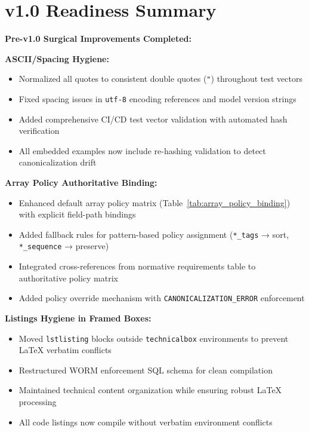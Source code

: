 \documentclass[12pt,a4paper]{article}
\begin{document}
\section*{v1.0 Readiness Summary}

\begin{technicalbox}
\textbf{Pre-v1.0 Surgical Improvements Completed:}

\textbf{ASCII/Spacing Hygiene:}
\begin{itemize}
\item Normalized all quotes to consistent double quotes (\texttt{"}) throughout test vectors
\item Fixed spacing issues in \texttt{utf-8} encoding references and model version strings
\item Added comprehensive CI/CD test vector validation with automated hash verification
\item All embedded examples now include re-hashing validation to detect canonicalization drift
\end{itemize}

\textbf{Array Policy Authoritative Binding:}
\begin{itemize}
\item Enhanced default array policy matrix (Table~\ref{tab:array_policy_binding}) with explicit field-path bindings
\item Added fallback rules for pattern-based policy assignment (\texttt{*\_tags} → sort, \texttt{*\_sequence} → preserve)
\item Integrated cross-references from normative requirements table to authoritative policy matrix
\item Added policy override mechanism with \texttt{CANONICALIZATION\_ERROR} enforcement
\end{itemize}

\textbf{Listings Hygiene in Framed Boxes:}
\begin{itemize}
\item Moved \texttt{lstlisting} blocks outside \texttt{technicalbox} environments to prevent LaTeX verbatim conflicts
\item Restructured WORM enforcement SQL schema for clean compilation
\item Maintained technical content organization while ensuring robust LaTeX processing
\item All code listings now compile without verbatim environment conflicts
\end{itemize}


\end{technicalbox}
\end{document}
